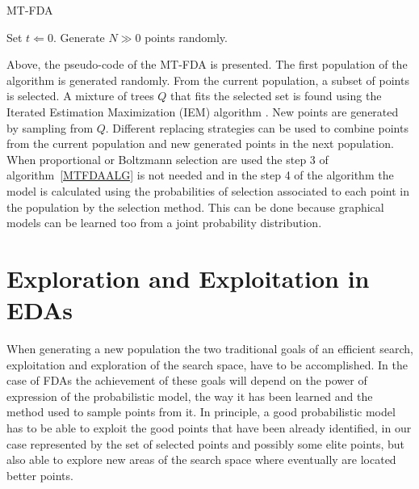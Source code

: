 \documentclass[runningheads]{llncs}
\begin{document}
 \begin{BAlgo}{MT-FDA}
 \label{MTFDAALG}
 \item Set $t\Leftarrow 0$. Generate $N\gg 0$ points randomly. 
 \item \Do
 \item {} 
 \item {}
 \item {}  
 \item {} 
 \item  {} 
\end{BAlgo} 
 
 
Above, the pseudo-code of the MT-FDA is presented. The first population of 
the algorithm is generated randomly. From the current population, a subset 
of points is selected. A mixture of trees $Q$ that fits the selected set is 
found using the Iterated Estimation Maximization (IEM) algorithm \cite{Meila:1999}. New points are generated by sampling from
$Q$. Different replacing strategies can be used 
to combine points from the current population and new generated points in the next
population.  When proportional or Boltzmann
selection are used the step 3 of algorithm~\ref{MTFDAALG} is not needed and in
the step 4 of the
algorithm  the model is calculated using the probabilities of selection
associated to each point in the population by the selection method. This can be done because graphical
  models can be learned too from a joint probability distribution.


\section{Exploration and Exploitation in EDAs} \label{EXPEXP}
 

 When generating a new population the two traditional goals of an efficient search, exploitation 
and exploration of the search space, have to be accomplished. In the case of FDAs
the achievement of these goals will depend on the power of expression of the probabilistic model, the way it has been learned and the method used to sample
points from it. In principle, a good probabilistic model has to be able to exploit
 the good points that have been already identified, in our case represented by the
 set of selected points and possibly some elite points, but also able  to
 explore new areas of the search space where eventually are located better
 points. 
\end{document}
